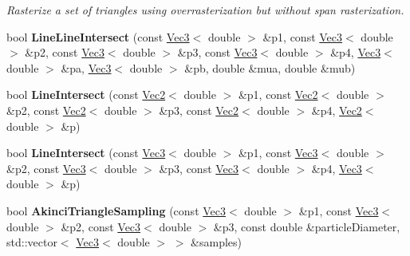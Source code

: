 \begin{DoxyCompactItemize}
\begin{DoxyCompactList}\small\item\em Rasterize a set of triangles using overrasterization but without span rasterization. \end{DoxyCompactList}\item 
\hypertarget{namespacehokusai_a47b1f0172ba1a0d1209756b9e4dd9eb9}{bool {\bfseries Line\+Line\+Intersect} (const \hyperlink{classhokusai_1_1Vec3}{Vec3}$<$ double $>$ \&p1, const \hyperlink{classhokusai_1_1Vec3}{Vec3}$<$ double $>$ \&p2, const \hyperlink{classhokusai_1_1Vec3}{Vec3}$<$ double $>$ \&p3, const \hyperlink{classhokusai_1_1Vec3}{Vec3}$<$ double $>$ \&p4, \hyperlink{classhokusai_1_1Vec3}{Vec3}$<$ double $>$ \&pa, \hyperlink{classhokusai_1_1Vec3}{Vec3}$<$ double $>$ \&pb, double \&mua, double \&mub)}\label{namespacehokusai_a47b1f0172ba1a0d1209756b9e4dd9eb9}

\item 
\hypertarget{namespacehokusai_ad0ce1ca5d024490ea59069da313122db}{bool {\bfseries Line\+Intersect} (const \hyperlink{classhokusai_1_1Vec2}{Vec2}$<$ double $>$ \&p1, const \hyperlink{classhokusai_1_1Vec2}{Vec2}$<$ double $>$ \&p2, const \hyperlink{classhokusai_1_1Vec2}{Vec2}$<$ double $>$ \&p3, const \hyperlink{classhokusai_1_1Vec2}{Vec2}$<$ double $>$ \&p4, \hyperlink{classhokusai_1_1Vec2}{Vec2}$<$ double $>$ \&p)}\label{namespacehokusai_ad0ce1ca5d024490ea59069da313122db}

\item 
\hypertarget{namespacehokusai_a41831906fbb252da31082762d34e6b5f}{bool {\bfseries Line\+Intersect} (const \hyperlink{classhokusai_1_1Vec3}{Vec3}$<$ double $>$ \&p1, const \hyperlink{classhokusai_1_1Vec3}{Vec3}$<$ double $>$ \&p2, const \hyperlink{classhokusai_1_1Vec3}{Vec3}$<$ double $>$ \&p3, const \hyperlink{classhokusai_1_1Vec3}{Vec3}$<$ double $>$ \&p4, \hyperlink{classhokusai_1_1Vec3}{Vec3}$<$ double $>$ \&p)}\label{namespacehokusai_a41831906fbb252da31082762d34e6b5f}

\item 
\hypertarget{namespacehokusai_ace9875195fa60dfec22ba859a3170d9e}{bool {\bfseries Akinci\+Triangle\+Sampling} (const \hyperlink{classhokusai_1_1Vec3}{Vec3}$<$ double $>$ \&p1, const \hyperlink{classhokusai_1_1Vec3}{Vec3}$<$ double $>$ \&p2, const \hyperlink{classhokusai_1_1Vec3}{Vec3}$<$ double $>$ \&p3, const double \&particle\+Diameter, std\+::vector$<$ \hyperlink{classhokusai_1_1Vec3}{Vec3}$<$ double $>$ $>$ \&samples)}\label{namespacehokusai_ace9875195fa60dfec22ba859a3170d9e}


\end{DoxyCompactItemize}
